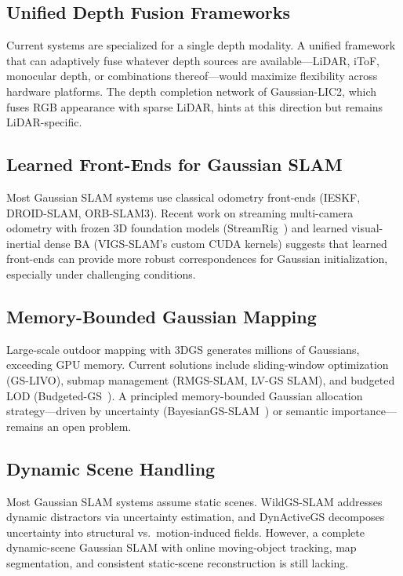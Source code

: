 \subsection{Unified Depth Fusion Frameworks}

Current systems are specialized for a single depth modality.  A unified
framework that can adaptively fuse whatever depth sources are
available---LiDAR, iToF, monocular depth, or combinations thereof---would
maximize flexibility across hardware platforms.  The depth completion
network of Gaussian-LIC2, which fuses RGB appearance with sparse LiDAR,
hints at this direction but remains LiDAR-specific.

\subsection{Learned Front-Ends for Gaussian SLAM}

Most Gaussian SLAM systems use classical odometry front-ends (IESKF,
DROID-SLAM, ORB-SLAM3).  Recent work on streaming multi-camera odometry
with frozen 3D foundation models (StreamRig~\cite{wei2026_streamrig}) and
learned visual-inertial dense BA (VIGS-SLAM's custom CUDA kernels)
suggests that learned front-ends can provide more robust correspondences
for Gaussian initialization, especially under challenging conditions.

\subsection{Memory-Bounded Gaussian Mapping}

Large-scale outdoor mapping with 3DGS generates millions of Gaussians,
exceeding GPU memory.  Current solutions include sliding-window
optimization (GS-LIVO), submap management (RMGS-SLAM, LV-GS SLAM), and
budgeted LOD (Budgeted-GS~\cite{wang2026_budgetedgs}).  A principled
memory-bounded Gaussian allocation strategy---driven by uncertainty
(BayesianGS-SLAM~\cite{kang2026_bayesiangssslam}) or semantic
importance---remains an open problem.

\subsection{Dynamic Scene Handling}

Most Gaussian SLAM systems assume static scenes.  WildGS-SLAM addresses
dynamic distractors via uncertainty estimation, and DynActiveGS decomposes
uncertainty into structural vs.\ motion-induced fields.  However, a
complete dynamic-scene Gaussian SLAM with online moving-object tracking,
map segmentation, and consistent static-scene reconstruction is still
lacking.

